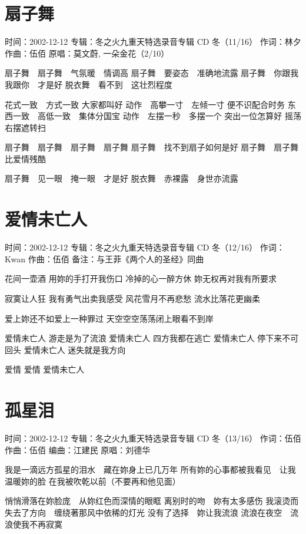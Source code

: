 \documentclass[UTF8,a4paper,oneside,twocolumn,12pt]{ctexbook}
\newcommand{\infopair}[2]{\textbullet #1：#2}
\newcommand{\zc}[1][伍佰]{\infopair{作词}{#1}}
\newcommand{\zq}[1][伍佰]{\infopair{作曲}{#1}}
\newcommand{\bq}[1][伍佰]{\infopair{编曲}{#1}}
\newcommand{\zj}[1]{\infopair{专辑}{#1}}
\newcommand{\yc}[1]{\infopair{原唱}{#1}}
\newcommand{\sj}[1]{\infopair{时间}{#1}}
\newcommand{\bz}[1]{\infopair{备注}{#1}}
\newenvironment{info}{\begin{flushleft}\kaishu
	}
	{\end{flushleft}\normalsize\yahei\par}
\newenvironment{lyric}{
	}
{}
\begin{document}
\section{扇子舞}
\begin{info}
	\sj{2002-12-12}
	\zj{冬之火九重天特选录音专辑 CD 冬（11/16）}
	\zc[林夕]
	\zq
	\yc{莫文蔚, 一朵金花（2/10）}
\end{info}
\begin{lyric}
	扇子舞　扇子舞　气氛暖　情调高
	扇子舞　要姿态　准确地流露
	扇子舞　你跟我　我跟你　才是好
	脱衣舞　看不到　这壮烈程度

	花式一致　方式一致 大家都叫好
	动作　高攀一寸　左倾一寸 便不识配合时务
	东西一致　高低一致　集体分国宝
	动作　左摆一秒　多摆一个 突出一位怎算好
	摇荡右摆遮转扫

	扇子舞　扇子舞　扇子舞　扇子舞
	扇子舞　找不到扇子如何是好
	扇子舞　扇子舞比爱情残酷

	扇子舞　见一眼　掩一眼　才是好
	脱衣舞　赤裸露　身世亦流露
\end{lyric}

\section{爱情未亡人}
\begin{info}
	\sj{2002-12-12}
	\zj{冬之火九重天特选录音专辑 CD 冬（12/16）}
	\zc[Kwan]
	\zq
	\bz{与王菲《两个人的圣经》同曲}
\end{info}
\begin{lyric}
	花间一壶酒 用妳的手打开我伤口
	冷掉的心一醉方休 妳无权再对我有所要求

	寂寞让人狂 我有勇气出卖我感受
	风花雪月不再悲愁 流水比落花更幽柔

	爱上妳还不如爱上一种罪过
	天空空空荡荡闭上眼看不到岸

	爱情未亡人 游走是为了流浪
	爱情未亡人 四方我都在逃亡
	爱情未亡人 停下来不可回头
	爱情未亡人 迷失就是我方向

	爱情 爱情 爱情未亡人
\end{lyric}

\section{孤星泪}
\begin{info}
	\sj{2002-12-12}
	\zj{冬之火九重天特选录音专辑 CD 冬（13/16）}
	\zc
	\zq
	\bq[江建民]
	\yc{刘德华}
\end{info}
\begin{lyric}
	我是一滴远方孤星的泪水　藏在妳身上已几万年
	所有妳的心事都被我看见　让我温暖妳的脸
	在我被吹乾以前（不要再和他见面）

	悄悄滑落在妳脸庞　从妳红色而深情的眼眶
	离别时的吻　妳有太多感伤
	我滚烫而失去了方向　缠绕著那风中依稀的灯光
	没有了选择　妳让我流浪
	流浪在夜空　流浪使我不再寂寞
\end{lyric}
\end{document}
